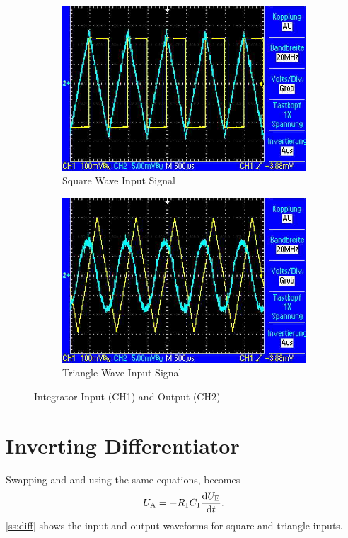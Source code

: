 \begin{figure}
	\centering
	\begin{subfigure}{0.4\textwidth}
		\centering
		\includegraphics[width=.9\linewidth]{./img/ss-int-1.jpg}
		\caption{Square Wave Input Signal}
	\end{subfigure}
	\begin{subfigure}{0.4\textwidth}
		\centering
		\includegraphics[width=.9\linewidth]{./img/ss-int-2.jpg}
		\caption{Triangle Wave Input Signal}
	\end{subfigure}
	\caption{Integrator Input (CH1) and Output (CH2)}
	\label{ss:int}
\end{figure}

\section{Inverting Differentiator}

Swapping  and  and using the same equations, \ua becomes \[U_\text{A} = - R_1 C_1 \frac{\mathop{}\!\mathrm{d} U_\text{E}}{\mathop{}\!\mathrm{d} t}.\]
\autoref{ss:diff} shows the input and output waveforms for square and triangle inputs.

